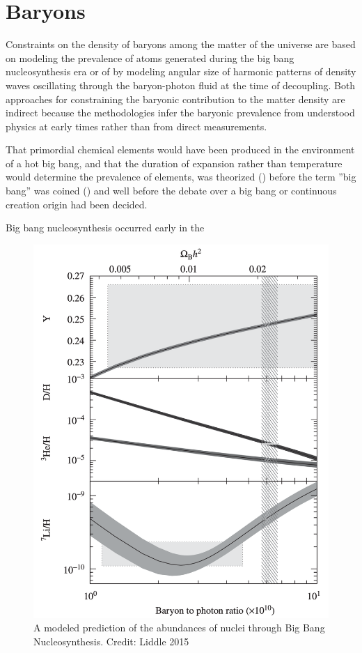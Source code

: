\documentclass{paper}
\begin{document}
\section{Baryons}
  Constraints on the density of baryons among the matter of the universe are
  based on modeling the prevalence of atoms generated during the big bang 
  nucleosynthesis era or of by modeling angular size of harmonic patterns of
  density waves oscillating through the baryon-photon fluid at the time of
  decoupling. Both approaches for constraining the baryonic contribution
  to the matter density are indirect because the methodologies infer the 
  baryonic prevalence from understood physics at early times rather than
  from direct measurements.

  That primordial chemical elements would have been produced in the 
  environment of a hot big bang, and that the duration of expansion rather 
  than temperature would determine the prevalence of elements, was theorized 
  (\cite{PhysRev.73.803}) before the term ''big bang'' was coined 
  (\cite{Hoyle1949}) and well before the debate over a big bang or continuous 
  creation origin had been decided.

  Big bang nucleosynthesis occurred early in the 

  \begin{figure}[!htb]
    \begin{centering}
    \includegraphics[scale=0.4]{BBN-ratios.pdf}
    \caption{A modeled prediction of the abundances of nuclei through Big
      Bang Nucleosynthesis.
    Credit: Liddle 2015}
    \label{fig:DE-ratios}
    \end{centering}
  \end{figure}
\end{document}
